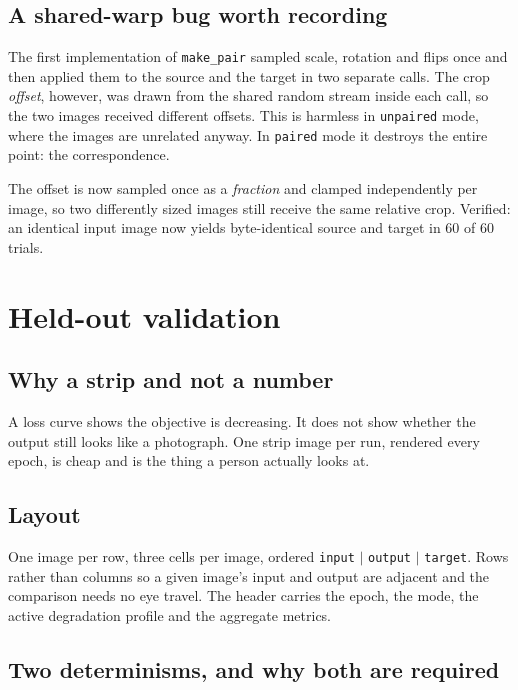 \documentclass[11pt,a4paper]{article}
\newcommand{\code}[1]{\texttt{#1}}
\begin{document}
\subsection{A shared-warp bug worth recording}

The first implementation of \code{make\_pair} sampled scale, rotation and flips
once and then applied them to the source and the target in two separate calls.
The crop \emph{offset}, however, was drawn from the shared random stream inside
each call, so the two images received different offsets. This is harmless in
\code{unpaired} mode, where the images are unrelated anyway. In \code{paired} mode
it destroys the entire point: the correspondence.

The offset is now sampled once as a \emph{fraction} and clamped independently per
image, so two differently sized images still receive the same relative crop.
Verified: an identical input image now yields byte-identical source and target in
60 of 60 trials.

\section{Held-out validation}
\label{sec:val}

\subsection{Why a strip and not a number}

A loss curve shows the objective is decreasing. It does not show whether the
output still looks like a photograph. One strip image per run, rendered every
epoch, is cheap and is the thing a person actually looks at.

\subsection{Layout}

One image per row, three cells per image, ordered \code{input} $\vert$
\code{output} $\vert$ \code{target}. Rows rather than columns so a given image's
input and output are adjacent and the comparison needs no eye travel. The header
carries the epoch, the mode, the active degradation profile and the aggregate
metrics.

\subsection{Two determinisms, and why both are required}
\end{document}

